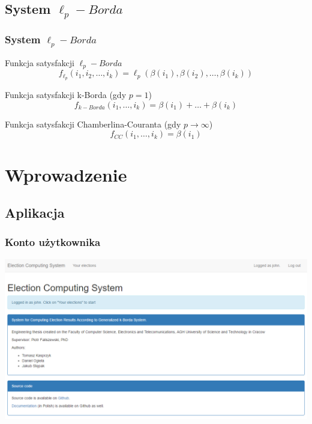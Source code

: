 \documentclass{beamer}
\begin{document}

\subsection{System $\ell_p-Borda$}
\begin{frame}
\frametitle{System $\ell_p-Borda$}

\begin{block}{Funkcja satysfakcji $\ell_p-Borda$}
$$
f_{\ell_p}(i_1, i_2, \ldots, i_k ) = \ell_p(\beta(i_1), \beta(i_2), \ldots ,\beta(i_k))
$$
\end{block}
\vspace{\baselineskip}
\vspace{\baselineskip}

\begin{exampleblock}{Funkcja satysfakcji k-Borda (gdy $p = 1$)}
$$
f_{k-Borda}(i_1, \ldots, i_k) = \beta(i_1) + \ldots + \beta(i_k)
$$
\end{exampleblock}

\begin{exampleblock}{Funkcja satysfakcji Chamberlina-Couranta (gdy $p \to \infty$)}
$$
f_{CC}(i_1, \ldots, i_k) = \beta(i_1)
$$
\end{exampleblock}


\end{frame}

\section{Wprowadzenie}
\subsection{Aplikacja}
\begin{frame}
\frametitle{Konto użytkownika}
\includegraphics[width=0.9\paperwidth]{pics/home_page.png}
\end{frame}
\end{document}
